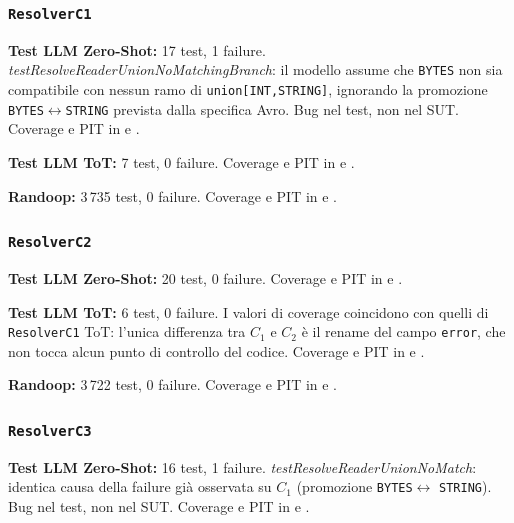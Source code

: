 \subsubsection{\texttt{ResolverC1}}

\textbf{Test LLM Zero-Shot:} 17 test, 1 failure.
\textit{testResolveReaderUnionNoMatchingBranch}: il modello assume
che \texttt{BYTES} non sia compatibile con nessun ramo di
\texttt{union[INT,STRING]}, ignorando la promozione
\texttt{BYTES}$\leftrightarrow$\texttt{STRING} prevista dalla
specifica Avro. Bug nel test, non nel SUT.
Coverage e PIT in  e
.

\textbf{Test LLM ToT:} 7 test, 0 failure.
Coverage e PIT in  e
.

\textbf{Randoop:} 3\,735 test, 0 failure.
Coverage e PIT in  e
.

\subsubsection{\texttt{ResolverC2}}

\textbf{Test LLM Zero-Shot:} 20 test, 0 failure.
Coverage e PIT in  e
.

\textbf{Test LLM ToT:} 6 test, 0 failure.
I valori di coverage coincidono con quelli di \texttt{ResolverC1}
ToT: l'unica differenza tra $C_1$ e $C_2$ è il rename del campo
\texttt{error}, che non tocca alcun punto di controllo del codice.
Coverage e PIT in  e
.

\textbf{Randoop:} 3\,722 test, 0 failure.
Coverage e PIT in  e
.

\subsubsection{\texttt{ResolverC3}}

\textbf{Test LLM Zero-Shot:} 16 test, 1 failure.
\textit{testResolveReaderUnionNoMatch}: identica causa della failure
già osservata su $C_1$ (promozione \texttt{BYTES}$\leftrightarrow$
\texttt{STRING}). Bug nel test, non nel SUT.
Coverage e PIT in  e
.

